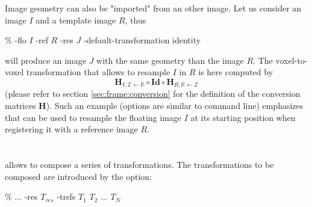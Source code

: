 Image geometry can also be "imported" from an other image. Let us consider an image $I$ and a template image $R$, thus 
\begin{code}{0.8}
\% \applyTrsf -flo $I$ -ref $R$ -res $J$ -default-transformation identity
\end{code}
will produce an image $J$ with the same geometry than the image $R$. The voxel-to-voxel transformation that allows to resample $I$ in $R$ is here computed by
\begin{displaymath}
\mathbf{H}_{I,\mathbb{Z} \leftarrow \mathbb{R}} 
\circ \mathbf{Id} \circ \mathbf{H}_{R,\mathbb{R} \leftarrow \mathbb{Z}} 
\end{displaymath}
(please refer to section \ref{sec:frame:conversion} for the definition of the conversion matrices $\mathbf{H}$). Such an example (options are similar to \blockmatching command line) emphasizes that \applyTrsf can be used to resample the floating image $I$ at its starting position when registering it with a reference image $R$.

\section{\applyTrsfToPoints}





\section{\buildPyramidImage}
\label{sec:buildPyramidImage}





\section{\composeTrsf}


\composeTrsf allows to compose a series of transformations. The transformations to be composed are introduced by the  option:
\begin{code}{1}
\% \composeTrsf ... -res $T_{res}$ -trsfs  $T_1$ $T_2$ ... $T_N$
\end{code}


